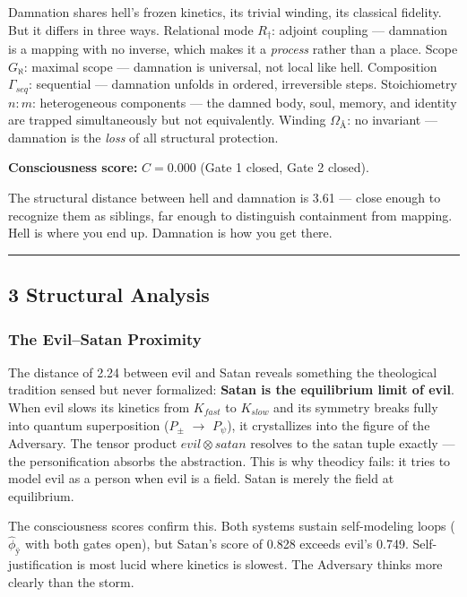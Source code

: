 \documentclass[12pt,a4paper]{article}
\begin{document}
Damnation shares hell's frozen kinetics, its trivial winding, its classical fidelity. But it differs in three ways. Relational mode $R_{\dagger}$: adjoint coupling --- damnation is a mapping with no inverse, which makes it a \emph{process} rather than a place. Scope $G_{\aleph}$: maximal scope --- damnation is universal, not local like hell. Composition $\Gamma_{seq}$: sequential --- damnation unfolds in ordered, irreversible steps. Stoichiometry $n{:}m$: heterogeneous components --- the damned body, soul, memory, and identity are trapped simultaneously but not equivalently. Winding $\Omega_{Å}$: no invariant --- damnation is the \emph{loss} of all structural protection.

\textbf{Consciousness score:} $C = 0.000$ (Gate 1 closed, Gate 2 closed).

The structural distance between hell and damnation is 3.61 --- close enough to recognize them as siblings, far enough to distinguish containment from mapping. Hell is where you end up. Damnation is how you get there.

\begin{center}
\rule{0.5\textwidth}{0.4pt}
\end{center}

\subsection{3 Structural Analysis}

\subsubsection{The Evil--Satan Proximity}

The distance of 2.24 between evil and Satan reveals something the theological tradition sensed but never formalized: \textbf{Satan is the equilibrium limit of evil}. When evil slows its kinetics from $K_{fast}$ to $K_{slow}$ and its symmetry breaks fully into quantum superposition ($P_{\pm}$ $\rightarrow$ $P_{\psi}$), it crystallizes into the figure of the Adversary. The tensor product ${evil} \otimes {satan}$ resolves to the satan tuple exactly --- the personification absorbs the abstraction. This is why theodicy fails: it tries to model evil as a person when evil is a field. Satan is merely the field at equilibrium.

The consciousness scores confirm this. Both systems sustain self-modeling loops ($\hat{\phi}_{ÿ}$ with both gates open), but Satan's score of 0.828 exceeds evil's 0.749. Self-justification is most lucid where kinetics is slowest. The Adversary thinks more clearly than the storm.
\end{document}
